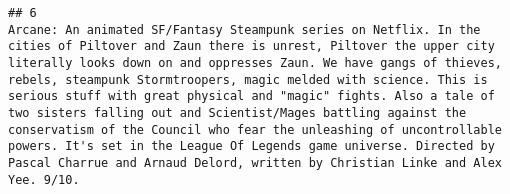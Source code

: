 \documentclass[
]{article}
\begin{document}
\begin{verbatim}
## 6                                                                                                                                                                                                                                                                                                                                                                                                                                                                                                                                                                                                                                                                                                                                                                                                                                                                                                                                                                                                                                                                                                                                                                                                                                                                                                                                                                                                                                                                                                                                                                                                                                                                                                                                                                                                                                                                                                                                                                                                                                                                                                                                                                                                                                                                                                                                                                                                               Arcane: An animated SF/Fantasy Steampunk series on Netflix. In the cities of Piltover and Zaun there is unrest, Piltover the upper city literally looks down on and oppresses Zaun. We have gangs of thieves, rebels, steampunk Stormtroopers, magic melded with science. This is serious stuff with great physical and "magic" fights. Also a tale of two sisters falling out and Scientist/Mages battling against the conservatism of the Council who fear the unleashing of uncontrollable powers. It's set in the League Of Legends game universe. Directed by Pascal Charrue and Arnaud Delord, written by Christian Linke and Alex Yee. 9/10.

\end{verbatim}
\end{document}
